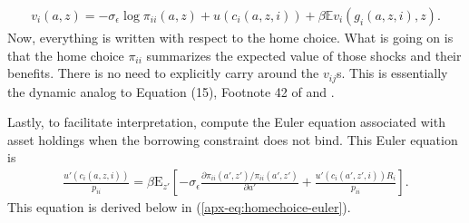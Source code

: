 \documentclass[12pt,pdftex]{article}
\begin{document}
\begin{onehalfspacing}
\begin{align}
v_i(a, z) = -\sigma_{\epsilon} \log \pi_{ii}(a,z) + u(c_{i}(a,z,i)) + \beta \mathbb{E} v_{i}(g_{i}(a,z,i),z).
\label{eq:apx-home-valuefun}
\end{align}
Now, everything is written with respect to the home choice. What is going on is that the home choice $\pi_{ii}$ summarizes the expected value of those shocks and their benefits. There is no need to explicitly carry around the $v_{ij}$s. This is essentially the dynamic analog to Equation (15), Footnote 42 of \citet{eaton2002technology} and \citet{arkolakis2012new}.

Lastly, to facilitate interpretation, compute the Euler equation associated with asset holdings when the borrowing constraint does not bind. This Euler equation is
\begin{align}
\frac{u'(c_{i}(a, z, i))}{p_{ii}} = \beta \mathrm{E}_{z'} \left[ -\sigma_{\epsilon} \frac{\partial \pi_{ii}(a',z') / \pi_{ii}(a',z')}{\partial a'} + \frac{u'(c_{i}(a', z', i))R_i}{p_{ii}} \right]. \nonumber
\end{align}
This equation is derived below in (\ref{apx-eq:homechoice-euler}).


\end{onehalfspacing}
\end{document}
